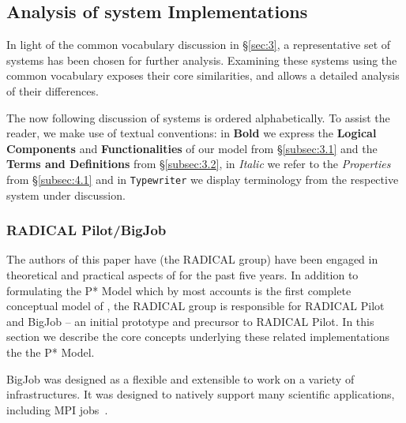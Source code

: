 \documentclass{sig-alternate}
\begin{document}
\subsection{Analysis of \pilot system Implementations}
\label{subsec:4.2}

\newcommand{\vocab}[1]{\textbf{#1}\xspace}
\newcommand{\prop}[1]{\textit{#1}\xspace}
\newcommand{\impterm}[1]{\texttt{#1}\xspace}

In light of the common vocabulary discussion in \S\ref{sec:3}, a
representative set of \pilot systems has been chosen for further analysis.
Examining these \pilot systems using the common vocabulary exposes their core
similarities, and allows a detailed analysis of their differences.

The now following discussion of \pilot systems is ordered alphabetically.  To
assist the reader, we make use of textual conventions: in \vocab{Bold} we
express the \vocab{Logical Components} and \vocab{Functionalities} of our model
from \S\ref{subsec:3.1} and the \vocab{Terms and Definitions} from
\S\ref{subsec:3.2}, in \prop{Italic} we refer to the \prop{Properties} from
\S\ref{subsec:4.1} and in \impterm{Typewriter} we display terminology from the
respective \pilot system under discussion.




\subsubsection{RADICAL Pilot/BigJob}

The authors of this paper have (the RADICAL group) have been engaged
in theoretical and practical aspects of \pilotjobs for the past five
years. In addition to formulating the P* Model which by most accounts
is the first complete conceptual model of \pilotjobs, the RADICAL
group is responsible for RADICAL Pilot and BigJob -- an initial
prototype and precursor to RADICAL Pilot. In this section we describe
the core concepts underlying these related implementations the the P*
Model.


BigJob was designed as a flexible and extensible \pilotjob to work on
a variety of infrastructures.  It was designed to natively support
many scientific applications, including MPI
jobs~\cite{saga_bigjob_condor_cloud}.
\end{document}
